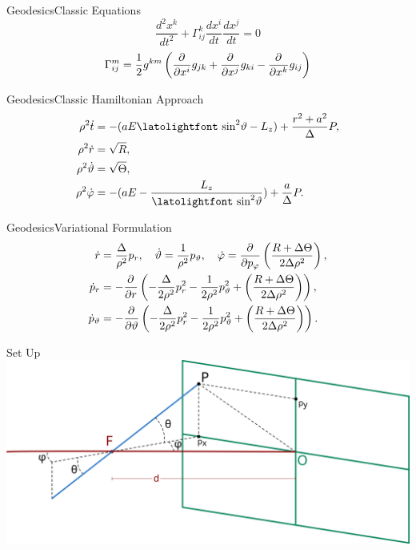 
\begin{frame}{Geodesics}{Classic Equations}
	{\Huge
	\[
		\frac{d^2x^k}{dt^2} + \Gamma^k_{ij} \frac{d x^i}{dt} \frac{d x^j}{dt} = 0
	\]}
	\vfill
	\[
		\Gamma^m_{ij} = \frac{1}{2} g^{km} \left( \frac{\partial^{} }{\partial x^i} g_{jk} + \frac{\partial^{} }{\partial x^j} g_{ki} - \frac{\partial^{} }{\partial x^k}g_{ij} \right)	
	\]
\end{frame}

\begin{frame}{Geodesics}{Classic Hamiltonian Approach}
	\large
	\begin{align*}
		\rho^2 \dot{t} &=-( aE\textrm{\latolightfont sin}^2\vartheta - L_z) + \frac{r^2+a^2}{\Delta}P, \\
		\rho^2 \dot{r} &= \sqrt{R}, \\
		\rho^2 \dot{\vartheta} &= \sqrt{\Theta}, \\
		\rho^2 \dot{\varphi} &=-( aE - \frac{L_z}{\textrm{\latolightfont sin}^2\vartheta}) + \frac{a}{\Delta}P.
	\end{align*}
\end{frame}

\begin{frame}{Geodesics}{Variational Formulation}
	\large
	\begin{align*}
		\dot{r} &= \frac{\Delta}{\rho^2} p_r, \quad \dot{\vartheta} = \frac{1}{\rho^2}p_\vartheta, \quad
		\dot{\varphi} = \frac{\partial^{} }{\partial p_\varphi}\left( \frac{R + \Delta\Theta}{2\Delta\rho^2} \right), \\
		\dot{p}_r &= - \frac{\partial^{} }{\partial r} \left( - \frac{\Delta}{2\rho^2}p_r^2 - \frac{1}{2\rho^2}p_\vartheta^2 + \left( \frac{R + \Delta\Theta}{2\Delta\rho^2} \right) \right), \\
		\dot{p}_\vartheta &= - \frac{\partial^{} }{\partial \vartheta} \left( - \frac{\Delta}{2\rho^2}p_r^2 - \frac{1}{2\rho^2}p_\vartheta^2 + \left( \frac{R + \Delta\Theta}{2\Delta\rho^2} \right) \right).
	\end{align*}
	
\end{frame}




{
	\begin{frame}[plain]{Set Up}
		\centering
		\includegraphics[width=0.8\paperwidth]{gfx/pinhole}
	\end{frame}
}

